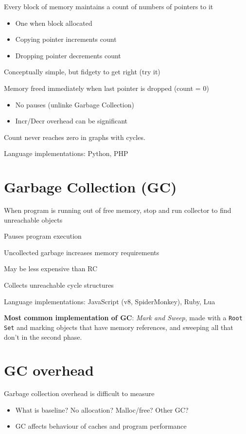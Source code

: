 \documentclass[11pt]{article}
\begin{document}
Every block of memory maintains a count of numbers of pointers to it
\begin{itemize}
	\item One when block allocated
	\item Copying pointer increments count
	\item Dropping pointer decrements count
\end{itemize}

Conceptually simple, but fidgety to get right (try it)

Memory freed immediately when last pointer is dropped (count = 0)

\begin{itemize}
	\item No pauses (unlinke Garbage Collection)
	\item Incr/Decr overhead can be significant
\end{itemize}

Count never reaches zero in graphs with cycles. 

Language implementations: Python, PHP

\section*{Garbage Collection (GC)}

When program is running out of free memory, stop and run collector to find unreachable objects

Pauses program execution

Uncollected garbage increases memory requirements

May be less expensive than RC

Collects unreachable cycle structures

Language implementations: JavaScript (v8, SpiderMonkey), Ruby, Lua

\textbf{Most common implementation of GC}: \textit{Mark and Sweep}, made with a \verb|Root Set| and marking objects that have memory references, and sweeping all that don't in the second phase. 

\section*{GC overhead}

Garbage collection overhead is difficult to measure
\begin{itemize}
	\item What is baseline? No allocation? Malloc/free? Other GC?
	\item GC affects behaviour of caches and program performance
\end{itemize}
\end{document}
